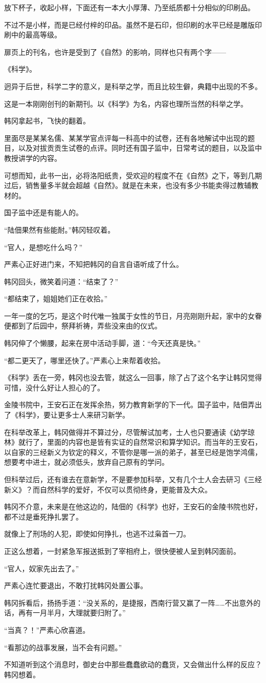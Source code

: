 放下杯子，收起小样，下面还有一本大小厚薄、乃至纸质都十分相似的印刷品。

不过不是小样，而是已经付梓的印品。虽然不是石印，但印刷的水平已经是雕版印刷中的最高等级。

扉页上的刊名，也许是受到了《自然》的影响，同样也只有两个字——

《科学》。

迥异于后世，科学二字的意义，是科举之学，而且比较生僻，典籍中出现的不多。

这是一本刚刚创刊的新期刊。以《科学》为名，内容也理所当然的科举之学。

韩冈拿起书，飞快的翻着。

里面尽是某某名儒、某某学官点评每一科高中的试卷，还有各地解试中出现的题目，以及对拔贡贡生试卷的点评。同时还有国子监中，日常考试的题目，以及监中教授讲学的内容。

可想而知，此书一出，必将洛阳纸贵，受欢迎的程度不在《自然》之下，等到几期过后，销售量多半就会超越《自然》。就是在未来，也没有多少书能卖得过教辅教材的。

国子监中还是有能人的。

“陆佃果然有些能耐。”韩冈轻叹着。

“官人，是想吃什么吗？”

严素心正好进门来，不知把韩冈的自言自语听成了什么。

韩冈回头，微笑着问道：“结束了？”

“都结束了，姐姐她们正在收拾。”

一年一度的乞巧，是这个时代唯一独属于女性的节日，月亮刚刚升起，家中的女眷便都到了后园中，祭拜祈祷，弄些没来由的仪式。

韩冈伸了个懒腰，起来在房中活动手脚，道：“今天还真是快。”

“都二更天了，哪里还快了。”严素心上来帮着收拾。

《科学》丢在一旁，韩冈也没去管，就这么一回事，除了占了这个名字让韩冈觉得可惜，没什么好让人担心的了。

金陵书院中，王安石正在发挥余热，努力教育新学的下一代。国子监中，陆佃弄出了《科学》，要让更多士人来研习新学。

在科举改革上，韩冈做得并不算过分，尽管解试加考，士人也只要通读《幼学琼林》就行了，里面的内容也是皆有实证的自然常识和算学知识。而当年的王安石，以自家的三经新义为钦定的释义，不管你是哪一派的弟子，甚至已经是饱学鸿儒，想要考中进士，就必须低头，放弃自己原有的学问。

但科举过后，还有谁去在意新学，不是要参加科举，又有几个士人会去研习《三经新义》？而自然科学的爱好，不仅可以贯彻终身，更能普及大众。

韩冈不介意，未来是在他这边的，陆佃的《科学》也好，王安石的金陵书院也好，都不过是垂死挣扎罢了。

就像上了刑场的人犯，即使如何挣扎，也逃不过枭首一刀。

正这么想着，一封紧急军报送抵到了宰相府上，很快便被人呈到韩冈面前。

“官人，奴家先出去了。”

严素心连忙要退出，不敢打扰韩冈处置公事。

韩冈拆看后，扬扬手道：“没关系的，是捷报，西南行营又赢了一阵……不出意外的话，再有一月半月，大理就要归附了。”

“当真？！”严素心欣喜道。

“看那边的战事发展，当不会有问题。”

不知道听到这个消息时，御史台中那些蠢蠢欲动的蠢货，又会做出什么样的反应？韩冈想着。
